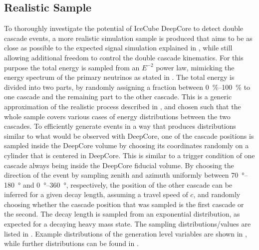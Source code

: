 \subsection{Realistic Sample}

To thoroughly investigate the potential of IceCube DeepCore to detect double cascade events, a more realistic simulation sample is produced that aims to be as close as possible to the expected signal simulation explained in , while still allowing additional freedom to control the double cascade kinematics. For this purpose the total energy is sampled from an $E^{-2}$ power law, mimicking the energy spectrum of the primary neutrinos as stated in .
The total energy is divided into two parts, by randomly assigning a fraction between \SIrange[range-phrase={~and~}]{0}{100}{\percent} to one cascade and the remaining part to the other cascade. This is a generic approximation of the realistic process described in , and chosen such that the whole sample covers various cases of energy distributions between the two cascades. To efficiently generate events in a way that produces distributions similar to what would be observed with DeepCore, one of the cascade positions is sampled inside the DeepCore volume by choosing its coordinates randomly on a cylinder that is centered in DeepCore. This is similar to a trigger condition of one cascade always being inside the DeepCore fiducial volume. By choosing the direction of the event by sampling zenith and azimuth uniformly between \SIrange[range-phrase={~and~}]{70}{180}{\degree} and \SIrange[range-phrase={~and~}]{0}{360}{\degree}, respectively, the position of the other cascade can be inferred for a given decay length, assuming a travel speed of $c$, and randomly choosing whether the cascade position that was sampled is the first cascade or the second. The decay length is sampled from an exponential distribution, as expected for a decaying heavy mass state.
The sampling distributions/values are listed in . Example distributions of the generation level variables are shown in , while further distributions can be found in .

